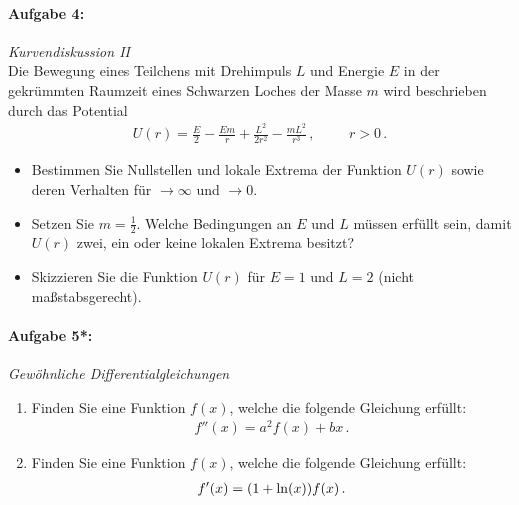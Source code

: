 \paragraph{Aufgabe 4: } \emph{Kurvendiskussion II}\\[0.2cm]
Die Bewegung eines Teilchens mit Drehimpuls $L$ und Energie $E$ in der gekrümmten Raumzeit eines Schwarzen Loches der Masse $m$ wird beschrieben durch das Potential
\begin{align*}
U(r)=\frac{E}{2}-\frac{Em}{r}+\frac{L^2}{2r^2}-\frac{mL^2}{r^3}\,, \hspace{1cm} r>0\,.
\end{align*}
\begin{itemize}
\item Bestimmen Sie Nullstellen und lokale Extrema der Funktion $U(r)$ sowie deren Verhalten für $\to\infty$ und $\to 0$.
\item Setzen Sie $m=\frac{1}{2}$. Welche Bedingungen an $E$ und $L$ müssen erfüllt sein, damit $U(r)$ zwei, ein oder keine lokalen Extrema besitzt?
\item Skizzieren Sie die Funktion $U(r)$ für $E=1$ und $L=2$ (nicht maßstabsgerecht).
\end{itemize} 
%
\paragraph{Aufgabe 5*: } \emph{Gewöhnliche Differentialgleichungen}
\begin{enumerate}[label=(\alph*)]
\item Finden Sie eine Funktion $f(x)$, welche die folgende Gleichung erfüllt:
\begin{align*}
f''(x)=a^2f(x)+bx\,.
\end{align*}
\item Finden Sie eine Funktion $f(x)$, welche die folgende Gleichung erfüllt:
\begin{align*}
f'(x)=\qty(1+\ln(x))f(x)\,.
\end{align*}
\end{enumerate}